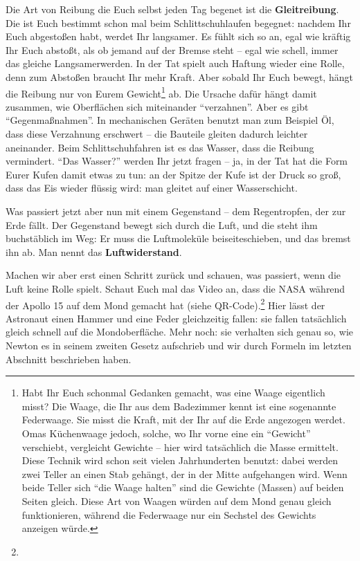 Die Art von Reibung die Euch selbst jeden Tag begenet ist die \textbf{Gleitreibung}. Die ist Euch bestimmt schon mal beim Schlittschuhlaufen begegnet: nachdem Ihr Euch abgestoßen habt, werdet Ihr langsamer. Es fühlt sich so an, egal wie kräftig Ihr Euch abstoßt, als ob jemand auf der Bremse steht -- egal wie schell, immer das gleiche Langsamerwerden. In der Tat spielt auch Haftung wieder eine Rolle, denn zum Abstoßen braucht Ihr mehr Kraft. Aber sobald Ihr Euch bewegt, hängt die Reibung nur von Eurem Gewicht\footnote{%
    Habt Ihr Euch schonmal Gedanken gemacht, was eine Waage eigentlich misst? Die Waage, die Ihr aus dem Badezimmer kennt ist eine sogenannte Federwaage. Sie misst die Kraft, mit der Ihr auf die Erde angezogen werdet. Omas Küchenwaage jedoch, solche, wo Ihr vorne eine ein ``Gewicht'' verschiebt, vergleicht Gewichte -- hier wird tatsächlich die Masse ermittelt. Diese Technik wird schon seit vielen Jahrhunderten benutzt: dabei werden zwei Teller an einen Stab gehängt, der in der Mitte aufgehangen wird. Wenn beide Teller sich ``die Waage halten'' sind die Gewichte (Massen) auf beiden Seiten gleich. Diese Art von Waagen würden auf dem Mond genau gleich funktionieren, während die Federwaage nur ein Sechstel des Gewichts anzeigen würde.}
ab. Die Ursache dafür hängt damit zusammen, wie Oberflächen sich miteinander ``verzahnen''. Aber es gibt ``Gegenmaßnahmen''. In mechanischen Geräten benutzt man zum Beispiel Öl, dass diese Verzahnung erschwert -- die Bauteile gleiten dadurch leichter aneinander. Beim Schlittschuhfahren ist es das Wasser, dass die Reibung vermindert. ``Das Wasser?'' werden Ihr jetzt fragen -- ja, in der Tat hat die Form Eurer Kufen damit etwas zu tun: an der Spitze der Kufe ist der Druck so groß, dass das Eis wieder flüssig wird: man gleitet auf einer Wasserschicht. 


Was passiert jetzt aber nun mit einem Gegenstand -- dem Regentropfen, der zur Erde fällt. Der Gegenstand bewegt sich durch die Luft, und die steht ihm buchstäblich im Weg: Er muss die Luftmoleküle beiseiteschieben, und das bremst ihn ab. Man nennt das \textbf{Luftwiderstand}. 
    
Machen wir aber erst einen Schritt zurück und schauen, was passiert, wenn die Luft keine Rolle spielt. Schaut Euch mal das Video an, dass die NASA während der Apollo 15 auf dem Mond gemacht hat (siehe QR-Code).\footnote{%
    }
Hier lässt der Astronaut einen Hammer und eine Feder gleichzeitig fallen: sie fallen tatsächlich gleich schnell auf die Mondoberfläche. Mehr noch: sie verhalten sich genau so, wie Newton es in seinem zweiten Gesetz aufschrieb und wir durch Formeln im letzten Abschnitt beschrieben haben.

